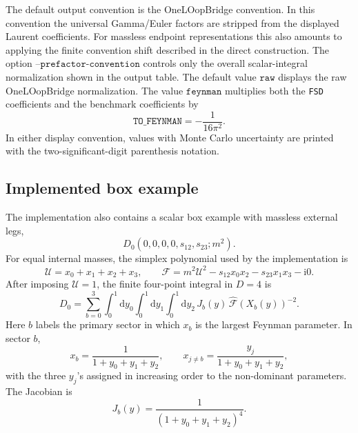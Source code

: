 \documentclass[11pt]{article}
\newcommand{\dd}{\mathrm d}
\newcommand{\ii}{\mathrm i}
\newcommand{\U}{\mathcal U}
\newcommand{\F}{\mathcal F}
\newcommand{\hF}{\widehat{\mathcal F}}
\begin{document}
The default output convention is the OneLOopBridge convention.  In this
convention the universal Gamma/Euler factors are stripped from the displayed
Laurent coefficients.  For massless endpoint representations this also amounts
to applying the finite convention shift described in the direct construction.
The option \(\texttt{--prefactor-convention}\) controls only the overall
scalar-integral normalization shown in the output table.  The default value
\(\texttt{raw}\) displays the raw OneLOopBridge normalization.  The value
\(\texttt{feynman}\) multiplies both the \texttt{FSD} coefficients and the
benchmark coefficients by
\begin{equation}
  \texttt{TO\_FEYNMAN}
  =
  -\frac{1}{16\pi^2}.
\end{equation}
In either display convention, values with Monte Carlo uncertainty are printed
with the two-significant-digit parenthesis notation.

\subsection{Implemented box example}

The implementation also contains a scalar box example with massless external
legs,
\begin{equation}
  D_0(0,0,0,0,s_{12},s_{23};m^2).
\end{equation}
For equal internal masses, the simplex polynomial used by the implementation is
\begin{equation}
  \U=x_0+x_1+x_2+x_3,
  \qquad
  \F
  =
  m^2\U^2
  -
  s_{12}x_0x_2
  -
  s_{23}x_1x_3
  -
  \ii0.
\end{equation}
After imposing \(\U=1\), the finite four-point integral in \(D=4\) is
\begin{equation}
  D_0
  =
  \sum_{b=0}^{3}
  \int_0^1\dd y_0
  \int_0^1\dd y_1
  \int_0^1\dd y_2\,
  J_b(y)\,
  \hF(X_b(y))^{-2}.
\end{equation}
Here \(b\) labels the primary sector in which \(x_b\) is the largest Feynman
parameter.  In sector \(b\),
\begin{equation}
  x_b=\frac{1}{1+y_0+y_1+y_2},
  \qquad
  x_{j\neq b}=\frac{y_j}{1+y_0+y_1+y_2},
\end{equation}
with the three \(y_j\)'s assigned in increasing order to the non-dominant
parameters.  The Jacobian is
\begin{equation}
  J_b(y)=\frac{1}{(1+y_0+y_1+y_2)^4}.
\end{equation}
\end{document}
